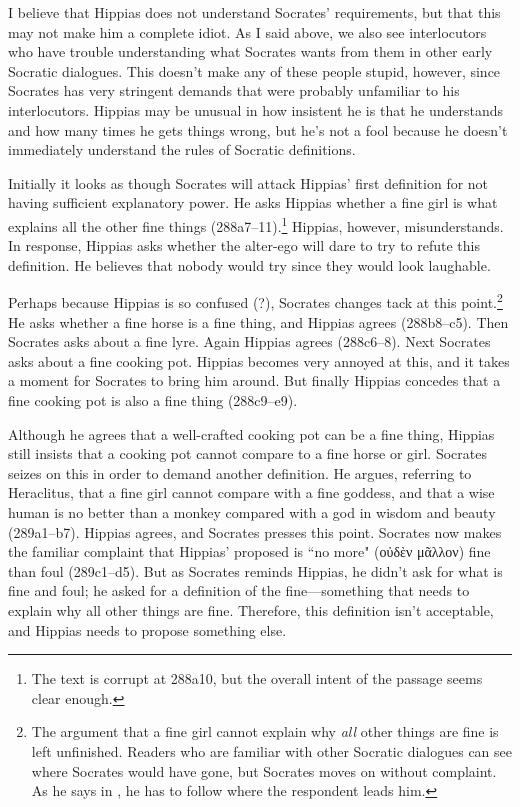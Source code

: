 \documentclass[11pt]{article}
\begin{document}
I believe that Hippias does not understand Socrates' requirements, but that this may not make him a complete idiot.  As I said above, we also see interlocutors who have trouble understanding what Socrates wants from them in other early Socratic dialogues.  This doesn't make any of these people stupid, however, since Socrates has very stringent demands that were probably unfamiliar to his interlocutors.  Hippias may be unusual in how insistent he is that he understands and how many times he gets things wrong, but he's not a fool because he doesn't immediately understand the rules of Socratic definitions.

Initially it looks as though Socrates will attack Hippias' first definition for not having sufficient explanatory power.  He asks Hippias whether a fine girl is what explains all the other fine things (288a7--11).\footnote{The text is corrupt at 288a10, but the overall intent of the passage seems clear enough.}  Hippias, however, misunderstands.  In response, Hippias asks whether the alter-ego will dare to try to refute this definition.  He believes that nobody would try since they would look laughable.

Perhaps because Hippias is so confused (?), Socrates changes tack at this point.\footnote{The argument that a fine girl cannot explain why \emph{all} other things are fine is left unfinished.  Readers who are familiar with other Socratic dialogues can see where Socrates would have gone, but Socrates moves on without complaint.  As he says in , he has to follow where the respondent leads him.}  He asks whether a fine horse is a fine thing, and Hippias agrees (288b8--c5).  Then Socrates asks about a fine lyre. Again Hippias agrees (288c6--8).  Next Socrates asks about a fine cooking pot.  Hippias becomes very annoyed at this, and it takes a moment for Socrates to bring him around.  But finally Hippias concedes that a fine cooking pot is also a fine thing (288c9--e9).

Although he agrees that a well-crafted cooking pot can be a fine thing, Hippias still insists that a cooking pot cannot compare to a fine horse or girl.  Socrates seizes on this in order to demand another definition.  He argues, referring to Heraclitus, that a fine girl cannot compare with a fine goddess, and that a wise human is no better than a monkey compared with a god in wisdom and beauty (289a1--b7).  Hippias agrees, and Socrates presses this point.  Socrates now makes the familiar complaint that Hippias' proposed  is ``no more" (οὐδὲν μᾶλλον) fine than foul (289c1--d5).  But as Socrates reminds Hippias, he didn't ask for what is fine and foul; he asked for a definition of the fine---something that needs to explain why all other things are fine.  Therefore, this definition isn't acceptable, and Hippias needs to propose something else.
\end{document}
